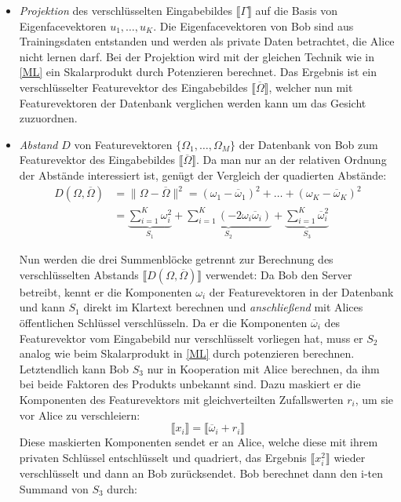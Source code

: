 \begin{itemize} 
\item \textit{Projektion} des verschlüsselten Eingabebildes $\llbracket \Gamma\rrbracket $ auf die Basis von Eigenfacevektoren $u_1,\ldots,u_K$. Die Eigenfacevektoren von Bob sind aus Trainingsdaten entstanden und werden als private Daten betrachtet, die Alice nicht lernen darf. Bei der Projektion wird mit der gleichen Technik wie in \ref{ML} ein Skalarprodukt durch Potenzieren berechnet. Das Ergebnis ist ein verschlüsselter Featurevektor des Eingabebildes  $\llbracket\overline\Omega\rrbracket$, welcher nun mit Featurevektoren der Datenbank verglichen werden kann um das Gesicht zuzuordnen.
\item \textit{Abstand} $D$ von Featurevektoren $\{\Omega_1,\ldots,\Omega_M\}$ der Datenbank von Bob zum Featurevektor des Eingabebildes $\llbracket\overline\Omega\rrbracket$. Da man nur an der relativen Ordnung der Abstände interessiert ist, genügt der Vergleich der quadierten Abstände:
\begin{equation}
\label{Aufteilung}
\begin{aligned}
D(\Omega,\overline\Omega)
&=
\|\Omega-\overline\Omega\|^2=(\omega_1-\overline\omega_1)^2+\ldots+(\omega_K-\overline\omega_K)^2\\
&=
\underbrace{\sum_{i=1}^{K}\omega_{i}^2}_{S_1}+
\underbrace{\sum_{i=1}^{K}(-2\omega_i\overline\omega_i)}_{S_2}+
\underbrace{\sum_{i=1}^{K}\overline\omega_{i}^2}_{S_3}
\end{aligned}
\end{equation}

Nun werden die drei Summenblöcke getrennt zur Berechnung des verschlüsselten Abstands $\llbracket D(\Omega,\overline\Omega)\rrbracket$ verwendet:
Da Bob den Server betreibt, kennt er die Komponenten $\omega_i$ der Featurevektoren in der Datenbank und kann $S_1$ direkt im Klartext berechnen und \textit{anschließend} mit Alices öffentlichen Schlüssel verschlüsseln. Da er die Komponenten $\overline\omega_i$ des Featurevektor vom Eingabebild nur verschlüsselt vorliegen hat, muss er $S_2$ analog wie beim Skalarprodukt in \ref{ML} durch potenzieren berechnen. Letztendlich kann Bob $S_3$ nur in Kooperation mit Alice berechnen, da ihm bei beide Faktoren des Produkts unbekannt sind. Dazu maskiert er die Komponenten des Featurevektors mit gleichverteilten Zufallswerten $r_i$, um sie vor Alice zu verschleiern:
\begin{equation*}
\llbracket x_i \rrbracket = \llbracket\overline\omega_i+r_i\rrbracket
\end{equation*}
Diese maskierten Komponenten sendet er an Alice, welche diese mit ihrem privaten Schlüssel entschlüsselt und quadriert, das Ergebnis $\llbracket x_{i}^2\rrbracket$ wieder verschlüsselt und dann an Bob zurücksendet. Bob berechnet dann den i-ten Summand von  $S_3$ durch:


\end{itemize}
